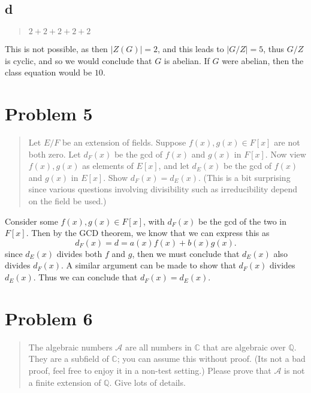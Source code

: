 \hypertarget{d-1}{%
\subsection{d}\label{d-1}}

\begin{quote}
\(2+2+2+2+2\)
\end{quote}

This is not possible, as then \(|Z(G)|=2\), and this leads to
\(|G/Z|=5\), thus \(G/Z\) is cyclic, and so we would conclude that \(G\)
is abelian. If \(G\) were abelian, then the class equation would be
\(10\).

\hypertarget{problem-5}{%
\section{Problem 5}\label{problem-5}}

\begin{quote}
Let \(E/F\) be an extension of fields. Suppose \(f(x),g(x)\in F[x]\) are
not both zero. Let \(d_F(x)\) be the gcd of \(f(x)\) and \(g(x)\) in
\(F[x]\). Now view \(f(x),g(x)\) as elements of \(E[x]\), and let
\(d_E(x)\) be the gcd of \(f(x)\) and \(g(x)\) in \(E[x]\). Show
\(d_F(x)=d_E(x)\). (This is a bit surprising since various questions
involving divisibility such as irreducibility depend on the field be
used.)
\end{quote}

Consider some \(f(x),g(x)\in F[x]\), with \(d_F(x)\) be the gcd of the
two in \(F[x]\). Then by the GCD theorem, we know that we can express
this as \[
d_F(x)=d=a(x)f(x)+b(x)g(x).
\] since \(d_E(x)\) divides both \(f\) and \(g\), then we must conclude
that \(d_E(x)\) also divides \(d_F(x)\). A similar argument can be made
to show that \(d_F(x)\) divides \(d_E(x)\). Thus we can conclude that
\(d_F(x)=d_E(x)\).

\hypertarget{problem-6}{%
\section{Problem 6}\label{problem-6}}

\begin{quote}
The algebraic numbers \(\mathcal{A}\) are all numbers in \(\mathbb{C}\)
that are algebraic over \(\mathbb{Q}\). They are a subfield of
\(\mathbb{C}\); you can assume this without proof. (Its not a bad proof,
feel free to enjoy it in a non-test setting.) Please prove that
\(\mathcal{A}\) is not a finite extension of \(\mathbb{Q}\). Give lots
of details.
\end{quote}

